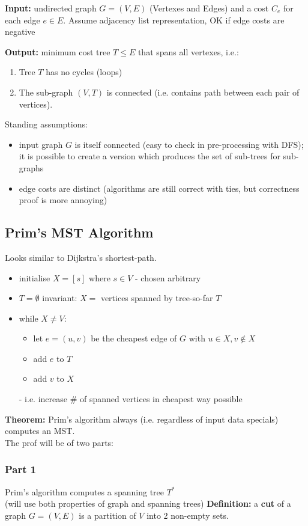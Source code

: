 \documentclass{scrartcl}
\begin{document}
{\bf Input: } undirected graph $G = (V, E)$ (Vertexes and Edges) and a cost
$C_e$ for each edge $e \in E$. Assume adjacency list representation, OK if edge
costs are negative

{\bf Output: } minimum cost tree $T \leq E$ that spans all vertexes, i.e.:
\begin{enumerate}
\item Tree $T$ has no cycles (loops)
\item The sub-graph $(V, T)$ is connected (i.e. contains path between each pair
  of vertices).
\end{enumerate}
Standing assumptions:
\begin{itemize}
\item input graph $G$ is itself connected (easy to check in pre-processing with
  DFS); it is possible to create a version which produces the set of sub-trees
  for sub-graphs
\item edge costs are distinct (algorithms are still correct with ties, but
  correctness proof is more annoying)
\end{itemize}

\subsection{Prim's MST Algorithm}
\label{sec:5-2}
Looks similar to Dijkstra's shortest-path.
\begin{itemize}
\item initialise $X = [s]$ where $s \in V$ - chosen arbitrary
\item $T = \emptyset$ invariant: $X = $ vertices spanned by tree-so-far $T$
\item while $X \neq V$:
  \begin{itemize}
  \item let $e = (u, v)$ be the cheapest edge of $G$ with $u \in X, v \notin X$
  \item add $e$ to $T$
  \item add $v$ to $X$
  \end{itemize}
  - i.e. increase \# of spanned vertices in cheapest way possible
\end{itemize} {\bf Theorem: } Prim's algorithm always (i.e. regardless of input
data specials)
computes an MST. \\
The prof will be of two parts:
\subsubsection*{Part 1 } Prim's algorithm computes a spanning tree $T^*$\\
(will use both properties of graph and spanning trees)
{\bf Definition: } a {\bf cut} of a graph $G = (V, E)$ is a partition of $V$
into 2 non-empty sets.\\
\end{document}

